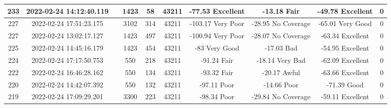 \begin{longtable*}{|c|c|c|c|c|c|c|c|c|c|}
233&2022-02-24 14:12:40.119&&1423&58&43211& -77.53    Excellent   & -13.18    Fair        & -49.78    Excellent   & 0\\\hline
{}227&2022-02-24 17:51:23.175&&3102&314&43211& -103.17   Very Poor   & -28.95    No Coverage & -65.01    Very Good   & 0\\\hline
{}227&2022-02-24 13:02:17.127&&1423&497&43211& -100.94   Very Poor   & -28.07    No Coverage & -63.34    Excellent   & 0\\\hline
{}225&2022-02-24 14:45:16.179&&1423&454&43211& -83       Very Good   & -17.03    Bad         & -54.95    Excellent   & 0\\\hline
{}224&2022-02-24 17:17:50.753&&550&218&43211& -91.24    Fair        & -18.14    Very Bad    & -62.09    Excellent   & 0\\\hline
{}222&2022-02-24 16:46:28.162&&550&134&43211& -93.32    Fair        & -20.17    Awful       & -63.66    Excellent   & 0\\\hline
{}220&2022-02-24 14:42:07.392&&550&132&43211& -97.11    Poor        & -14.66    Poor        & -71.39    Good        & 0\\\hline
{}219&2022-02-24 17:09:29.201&&3300&223&43211& -98.34    Poor        & -29.84    No Coverage & -59.11    Excellent   & 0\\\hline

\end{longtable*}
